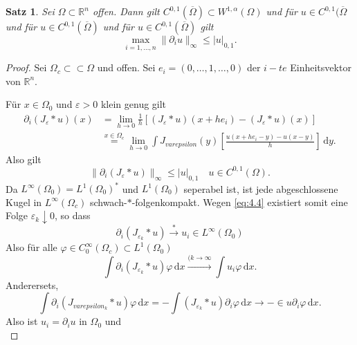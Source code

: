 \documentclass[
paper=a4,
bibtotocnumbered,
liststotocnumbered,
tablecaptionabove,
pointlessnumbers,
twoside,
openright,
10pt
]
{report}
\let\phi\varphi
\newtheorem{satz}[thm]{Satz}
\theoremstyle{definition}
\numberwithin{equation}{chapter}
\begin{document}
\begin{satz}
 Sei $\Omega\subset \mathbb R^n$ offen. Dann gilt $C^{0,1}(\overline{\Omega})\subset W^{1,\alpha}(\Omega)$ und für $u\in C^{0,1}(\overline{\Omega}$ und für $u\in C^{0,1}(\overline{\Omega})$ und für $u\in C^{0,1}(\overline{\Omega})$ gilt
 \begin{equation}
  \max_{i=1,\ldots, n} \| \partial_i u\|_\infty\le |u|_{0,1}.
 \end{equation}
\end{satz}

\begin{proof}
 Sei $\Omega_c \subset \subset \Omega$ und offen. Sei $e_i = (0,\ldots, 1, \ldots, 0)$ der $i-te$ Einheitsvektor von $\mathbb R^n$.
 
 Für $x\in \Omega_0$ und $\varepsilon >0$ klein genug gilt
 \begin{align*}
  \partial_i(J_\varepsilon * u) (x)&= \lim_{h\to 0} \frac{1}{h} \left [ (J_\varepsilon * u) (x+he_i) - (J_\varepsilon*u) (x)\right ] \\
  &\stackrel{x\in \Omega_c}=\lim_{h\to 0} \int J_{varepsilon}(y) \left [ \frac{u(x+he_i -y) - u(x-y)}{h} \right ]\, \mathrm dy.
 \end{align*}
 Also gilt
 \begin{equation}\label{eq:4.4}
  \|\partial_i (J_\varepsilon * u) \|_\infty \le |u|_{0,1} \quad u\in C^{0,1}(\Omega).
 \end{equation}
 Da $L^\infty(\Omega_0) = L^1(\Omega_0)^*$ und $L^1(\Omega_0)$ seperabel ist, ist jede abgeschlossene Kugel in $L^\infty(\Omega_c)$ schwach-$*$-folgenkompakt. Wegen \eqref{eq:4.4} existiert somit eine Folge $\varepsilon_k \downarrow 0$, so dass 
 \begin{equation}
  \partial_i (J_{\varepsilon_k} * u) \stackrel{*}{\to} u_i \in L^\infty(\Omega_0)
 \end{equation}
 Also für alle $\phi \in C_0^\infty(\Omega_c) \subset L^1(\Omega_0)$
 \begin{equation}
  \int \partial_i (J_{\varepsilon_k} *u) \phi \, \mathrm dx \stackrel{(k\to \infty}{\to} \int u_i \phi \, \mathrm dx.
 \end{equation}
 Anderersets,
 \begin{equation}
  \int \partial_i (J_{varepsilon_k} * u) \phi \, \mathrm dx = - \int (J_{\varepsilon_k} * u) \partial_i \phi \, \mathrm dx \to - \in u\partial_i \phi \, \mathrm dx.
 \end{equation}
Also ist $u_i = \partial_i u$ in $\Omega_0$ und 
\begin{equation}\label{eq:4.5}

\end{equation}
\end{proof}
\end{document}

